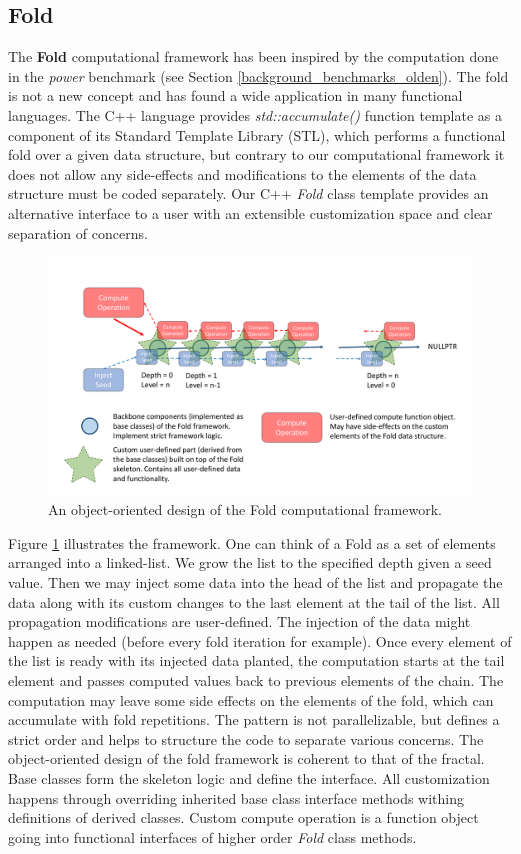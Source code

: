 \subsection{Fold}
\label{frameworks_fold}
\quad The \textbf{Fold} computational framework has been inspired by the computation done in the \textit{power} benchmark (see Section \ref{background_benchmarks_olden}). The fold is not a new concept and has found a wide application in many functional languages. The C++ language provides \textit{std::accumulate()} function template as a component of its Standard Template Library (STL), which performs a functional fold over a given data structure, but contrary to our computational framework it does not allow any side-effects and modifications to the elements of the data structure must be coded separately. Our C++ \textit{Fold} class template provides an alternative interface to a user with an extensible customization space and clear separation of concerns.\newline\null
\begin{figure}[ht]
\includegraphics[width=1.0\textwidth]{images/Fold.pdf}
\caption{An object-oriented design of the Fold computational framework.}
\label{fig:fold}
\end{figure}\newline\null
\quad Figure \ref{fig:fold} illustrates the framework. One can think of a Fold as a set of elements arranged into a linked-list. We grow the list to the specified depth given a seed value. Then we may inject some data into the head of the list and propagate the data along with its custom changes to the last element at the tail of the list. All propagation modifications are user-defined. The injection of the data might happen as needed (before every fold iteration for example). Once every element of the list is ready with its injected data planted, the computation starts at the tail element and passes computed values back to previous elements of the chain. The computation may leave some side effects on the elements of the fold, which can accumulate with fold repetitions. The pattern is not parallelizable, but defines a strict order and helps to structure the code to separate various concerns. The object-oriented design of the fold framework is coherent to that of the fractal. Base classes form the skeleton logic and define the interface. All customization happens through overriding inherited base class interface methods withing definitions of derived classes. Custom compute operation is a function object going into functional interfaces of higher order \textit{Fold} class methods.
